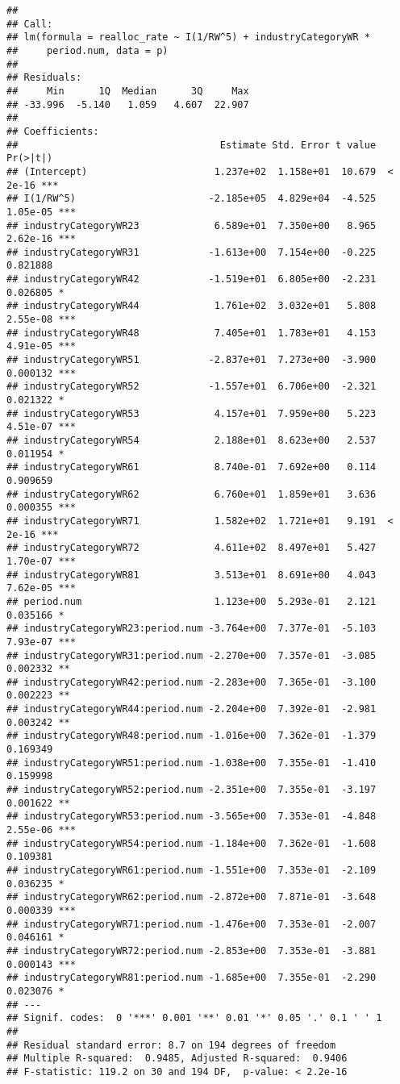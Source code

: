 \documentclass[
]{article}
\begin{document}
\begin{verbatim}
## 
## Call:
## lm(formula = realloc_rate ~ I(1/RW^5) + industryCategoryWR * 
##     period.num, data = p)
## 
## Residuals:
##     Min      1Q  Median      3Q     Max 
## -33.996  -5.140   1.059   4.607  22.907 
## 
## Coefficients:
##                                   Estimate Std. Error t value Pr(>|t|)    
## (Intercept)                      1.237e+02  1.158e+01  10.679  < 2e-16 ***
## I(1/RW^5)                       -2.185e+05  4.829e+04  -4.525 1.05e-05 ***
## industryCategoryWR23             6.589e+01  7.350e+00   8.965 2.62e-16 ***
## industryCategoryWR31            -1.613e+00  7.154e+00  -0.225 0.821888    
## industryCategoryWR42            -1.519e+01  6.805e+00  -2.231 0.026805 *  
## industryCategoryWR44             1.761e+02  3.032e+01   5.808 2.55e-08 ***
## industryCategoryWR48             7.405e+01  1.783e+01   4.153 4.91e-05 ***
## industryCategoryWR51            -2.837e+01  7.273e+00  -3.900 0.000132 ***
## industryCategoryWR52            -1.557e+01  6.706e+00  -2.321 0.021322 *  
## industryCategoryWR53             4.157e+01  7.959e+00   5.223 4.51e-07 ***
## industryCategoryWR54             2.188e+01  8.623e+00   2.537 0.011954 *  
## industryCategoryWR61             8.740e-01  7.692e+00   0.114 0.909659    
## industryCategoryWR62             6.760e+01  1.859e+01   3.636 0.000355 ***
## industryCategoryWR71             1.582e+02  1.721e+01   9.191  < 2e-16 ***
## industryCategoryWR72             4.611e+02  8.497e+01   5.427 1.70e-07 ***
## industryCategoryWR81             3.513e+01  8.691e+00   4.043 7.62e-05 ***
## period.num                       1.123e+00  5.293e-01   2.121 0.035166 *  
## industryCategoryWR23:period.num -3.764e+00  7.377e-01  -5.103 7.93e-07 ***
## industryCategoryWR31:period.num -2.270e+00  7.357e-01  -3.085 0.002332 ** 
## industryCategoryWR42:period.num -2.283e+00  7.365e-01  -3.100 0.002223 ** 
## industryCategoryWR44:period.num -2.204e+00  7.392e-01  -2.981 0.003242 ** 
## industryCategoryWR48:period.num -1.016e+00  7.362e-01  -1.379 0.169349    
## industryCategoryWR51:period.num -1.038e+00  7.355e-01  -1.410 0.159998    
## industryCategoryWR52:period.num -2.351e+00  7.355e-01  -3.197 0.001622 ** 
## industryCategoryWR53:period.num -3.565e+00  7.353e-01  -4.848 2.55e-06 ***
## industryCategoryWR54:period.num -1.184e+00  7.362e-01  -1.608 0.109381    
## industryCategoryWR61:period.num -1.551e+00  7.353e-01  -2.109 0.036235 *  
## industryCategoryWR62:period.num -2.872e+00  7.871e-01  -3.648 0.000339 ***
## industryCategoryWR71:period.num -1.476e+00  7.353e-01  -2.007 0.046161 *  
## industryCategoryWR72:period.num -2.853e+00  7.353e-01  -3.881 0.000143 ***
## industryCategoryWR81:period.num -1.685e+00  7.355e-01  -2.290 0.023076 *  
## ---
## Signif. codes:  0 '***' 0.001 '**' 0.01 '*' 0.05 '.' 0.1 ' ' 1
## 
## Residual standard error: 8.7 on 194 degrees of freedom
## Multiple R-squared:  0.9485, Adjusted R-squared:  0.9406 
## F-statistic: 119.2 on 30 and 194 DF,  p-value: < 2.2e-16
\end{verbatim}
\end{document}
